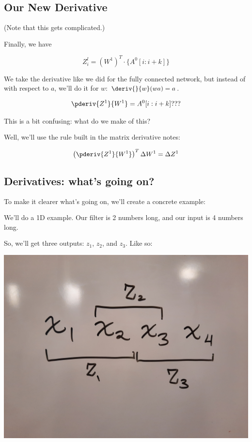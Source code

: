         
    \subsection{Our New Derivative}
    
        (Note that this gets complicated.)
    
        Finally, we have 
        
        \begin{equation*}
            Z_i^l = (W^1)^T \cdot \{ A^0 [i:i+k] \} 
        \end{equation*}
        
        We take the derivative like we did for the fully connected network, but instead of with respect to $a$, we'll do it for $w$: $\deriv{}{w} (wa) = a$.
        
        \begin{equation*}
            \pderiv{Z^1}{W^1} = A^0 [i:i+k] ???
        \end{equation*}
        
        This is a bit confusing: what do we make of this?
        
        Well, we'll use the rule built in the matrix derivative notes:
        
        \begin{equation*}
            \left( \pderiv{Z^1}{W^1} \right)^T \Delta W^1 = \Delta Z^1
        \end{equation*}
    
    \subsection{Derivatives: what's going on?}
    
        To make it clearer what's going on, we'll create a concrete example: 
        
        We'll do a 1D example. Our filter is 2 numbers long, and our input is 4 numbers long.
        
        So, we'll get three outputs: $z_1$, $z_2$, and $z_3$. Like so:
        
        \includegraphics[width=\textwidth]{images/convolutional_neural_networks_images/WBConvExample.jpg}
        
